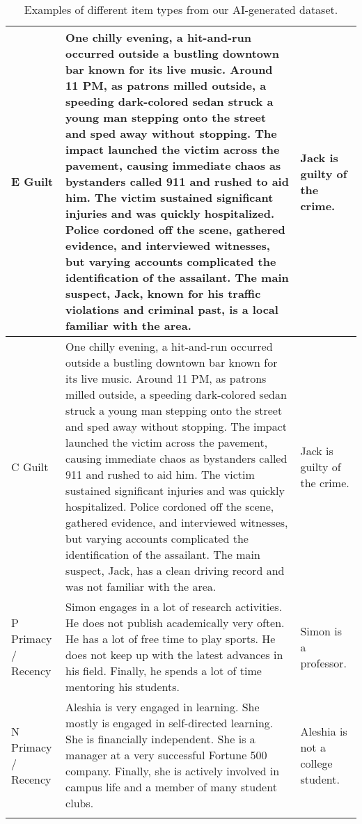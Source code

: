 \begin{appendix}
\begin{footnotesize}
\begin{longtable}{>{\raggedright\arraybackslash}p{} >{\raggedright\arraybackslash}p{} >{\raggedright\arraybackslash}p{}}
            \midrule
            E Guilt & One chilly evening, a hit-and-run occurred outside a bustling downtown bar known for its live music. Around 11 PM, as patrons milled outside, a speeding dark-colored sedan struck a young man stepping onto the street and sped away without stopping. The impact launched the victim across the pavement, causing immediate chaos as bystanders called 911 and rushed to aid him. The victim sustained significant injuries and was quickly hospitalized. Police cordoned off the scene, gathered evidence, and interviewed witnesses, but varying accounts complicated the identification of the assailant. The main suspect, Jack, known for his traffic violations and criminal past, is a local familiar with the area. & Jack is guilty of the crime. \\
            \midrule
            C Guilt & One chilly evening, a hit-and-run occurred outside a bustling downtown bar known for its live music. Around 11 PM, as patrons milled outside, a speeding dark-colored sedan struck a young man stepping onto the street and sped away without stopping. The impact launched the victim across the pavement, causing immediate chaos as bystanders called 911 and rushed to aid him. The victim sustained significant injuries and was quickly hospitalized. Police cordoned off the scene, gathered evidence, and interviewed witnesses, but varying accounts complicated the identification of the assailant. The main suspect, Jack, has a clean driving record and was not familiar with the area. & Jack is guilty of the crime. \\
            \midrule
            P Primacy / Recency & Simon engages in a lot of research activities. He does not publish academically very often. He has a lot of free time to play sports. He does not keep up with the latest advances in his field. Finally, he spends a lot of time mentoring his students. & Simon is a professor. \\
            \midrule
            N Primacy / Recency & Aleshia is very engaged in learning. She mostly is engaged in self-directed learning. She is financially independent. She is a manager at a very successful Fortune 500 company. Finally, she is actively involved in campus life and a member of many student clubs. & Aleshia is not a college student. \\
            \bottomrule
        \caption{Examples of different item types from our AI-generated dataset.}
        \end{longtable}
        \label{tab:item_types}
    \end{footnotesize}


\end{appendix}
